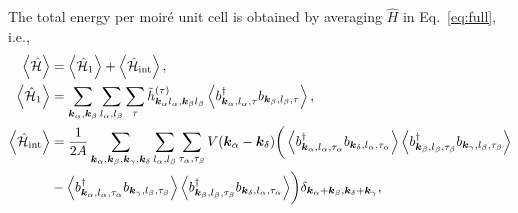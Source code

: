 \documentclass[aps,prl,onecolumn,superscriptaddress,longbibliography]{revtex4-2}
\begin{document}
{
The total energy per moir\'e unit cell is obtained by averaging $\hat{H}$ in Eq.~\eqref{eq:full}, i.e., 
\begin{equation}\label{eq:total}
    \begin{aligned}
        \expval{\hat{\mathcal{H}}}&=\expval{\hat{\mathcal{H}}_1}+\expval{\hat{\mathcal{H}}_{\text{int}}},\\
        \expval{\hat{\mathcal{H}}_1}&=\sum_{\bm{k}_{\alpha},\bm{k}_{\beta}}\sum_{l_{\alpha},l_{\beta}}\sum_{\tau} \tilde{h}^{(\tau)}_{\bm{k}_{\alpha}l_{\alpha},\bm{k}_{\beta}l_{\beta}} \expval{b_{\bm{k}_{\alpha},l_{\alpha},\tau}^\dagger b_{\bm{k}_{\beta},l_{\beta},\tau}},\\
        \expval{\hat{\mathcal{H}}_{\text{int}}}&=\frac{1}{2A} \sum_{\bm{k}_{\alpha},\bm{k}_{\beta},\bm{k}_{\gamma},\bm{k}_{\delta}  }\sum_{l_{\alpha},l_{\beta}}\sum_{\tau_{\alpha},\tau_{\beta}} V(\bm{k}_{\alpha}-\bm{k}_{\delta}) \biggr( \expval{b_{\bm{k}_{\alpha},l_{\alpha},\tau_{\alpha}}^\dagger b_{\bm{k}_{\delta},l_{\alpha},\tau_{\alpha}}} \expval{ b_{\bm{k}_{\beta},l_{\beta},\tau_{\beta}}^\dagger b_{\bm{k}_{\gamma},l_{\beta},\tau_{\beta}}} \\
        &- \expval{b_{\bm{k}_{\alpha},l_{\alpha},\tau_{\alpha}}^\dagger b_{\bm{k}_{\gamma},l_{\beta},\tau_{\beta}} }\expval{b_{\bm{k}_{\beta},l_{\beta},\tau_{\beta}}^\dagger b_{\bm{k}_{\delta},l_{\alpha},\tau_{\alpha}}} \biggr) \delta_{\bm{k}_{\alpha}+\bm{k}_{\beta}, \bm{k}_{\delta}+\bm{k}_{\gamma}},
    \end{aligned}
\end{equation}
}
\end{document}
